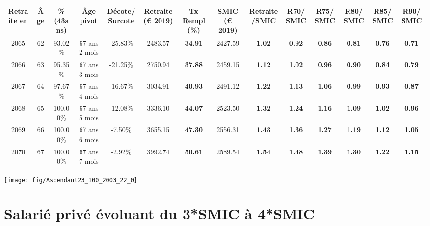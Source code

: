 \begin{adjustbox}{max width=\textwidth} 
\begin{tabular}[htb]{|c|c||c|c|c||c|c||c|c||c|c|c|c|c|} 
\hline 
 Retraite en &  Âge &  \%(43ans) &  Âge pivot &  Décote/Surcote &  Retraite (\euro{} 2019) &  Tx Rempl(\%) &  SMIC (\euro{} 2019) &  Retraite/SMIC &  R70/SMIC &  R75/SMIC &  R80/SMIC &  R85/SMIC &  R90/SMIC \\ 
\hline \hline 
 2065 &  62 &  93.02\% &  67 ans 2 mois &  -25.83\% &  2483.57 &  {\bf 34.91} &  2427.59 &  {\bf 1.02} &  {\bf {\color{red} 0.92}} &  {\bf {\color{red} 0.86}} &  {\bf {\color{red} 0.81}} &  {\bf {\color{red} 0.76}} &  {\bf {\color{red} 0.71}} \\ 
\hline 
 2066 &  63 &  95.35\% &  67 ans 3 mois &  -21.25\% &  2750.94 &  {\bf 37.88} &  2459.15 &  {\bf 1.12} &  {\bf 1.02} &  {\bf {\color{red} 0.96}} &  {\bf {\color{red} 0.90}} &  {\bf {\color{red} 0.84}} &  {\bf {\color{red} 0.79}} \\ 
\hline 
 2067 &  64 &  97.67\% &  67 ans 4 mois &  -16.67\% &  3034.91 &  {\bf 40.93} &  2491.12 &  {\bf 1.22} &  {\bf 1.13} &  {\bf 1.06} &  {\bf {\color{red} 0.99}} &  {\bf {\color{red} 0.93}} &  {\bf {\color{red} 0.87}} \\ 
\hline 
 2068 &  65 &  100.00\% &  67 ans 5 mois &  -12.08\% &  3336.10 &  {\bf 44.07} &  2523.50 &  {\bf 1.32} &  {\bf 1.24} &  {\bf 1.16} &  {\bf 1.09} &  {\bf 1.02} &  {\bf {\color{red} 0.96}} \\ 
\hline 
 2069 &  66 &  100.00\% &  67 ans 6 mois &  -7.50\% &  3655.15 &  {\bf 47.30} &  2556.31 &  {\bf 1.43} &  {\bf 1.36} &  {\bf 1.27} &  {\bf 1.19} &  {\bf 1.12} &  {\bf 1.05} \\ 
\hline 
 2070 &  67 &  100.00\% &  67 ans 7 mois &  -2.92\% &  3992.74 &  {\bf 50.61} &  2589.54 &  {\bf 1.54} &  {\bf 1.48} &  {\bf 1.39} &  {\bf 1.30} &  {\bf 1.22} &  {\bf 1.15} \\ 
\hline 
\hline 
\end{tabular} 
\end{adjustbox} 
 
 \vspace{0.1cm} 

 {\hspace{-2.2cm}\texttt{[image: fig/Ascendant23\_100\_2003\_22\_0]}} 

\newpage 
 
\chapter{Salarié privé évoluant du 3*SMIC à 4*SMIC} 

